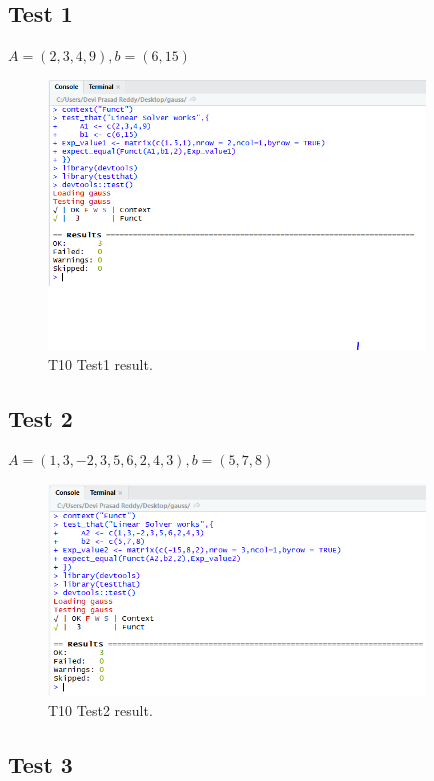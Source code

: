 \documentclass[12pt, titlepage]{article}
\begin{document}
\subsection{Test 1 } \label{cei_t1}

$A = (2, 3, 4, 9), b = (6, 15)$

\begin{figure}[H]
\centering
 \includegraphics[width=100mm]{UT1}
  \caption{T10 Test1 result.}
  \label{fig:T9}
\end{figure}

\subsection{Test 2} \label{cei_t2}

 $A = (1, 3, -2, 3, 5, 6, 2, 4, 3), b = (5, 7, 8)$

\begin{figure}[H]
\centering
 \includegraphics[width=100mm]{UT2}
  \caption{T10 Test2 result.}
  \label{fig:T10}
\end{figure}

\subsection{Test 3} \label{cei_t3}
\end{document}
